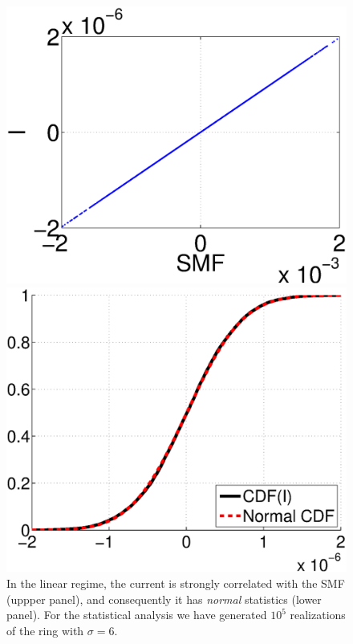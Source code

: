 \documentclass[aps,pre,floats,floatfix,twocolumn]{revtex4}
\begin{document}
\begin{figure}

\centering

\includegraphics[width=0.9\hsize]{lin2.eps}

\includegraphics[width=0.8\hsize]{lin1.eps}

\caption{
In the linear regime, the current is strongly 
correlated with the SMF (uppper panel), and 
consequently it has {\em normal} statistics (lower panel). 
For the statistical analysis we have generated $10^5$ 
realizations of the ring with $\sigma=6$. 
}
\label{fa1}
\end{figure}





\end{document}
